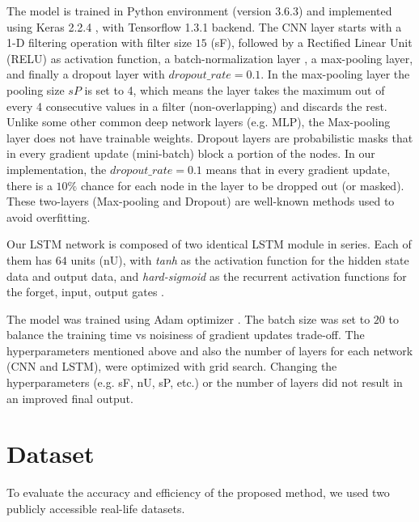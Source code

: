 \documentclass[letterpaper, 10 pt, conference]{ieeeconf}
\begin{document}
The model is trained in Python environment (version 3.6.3) and implemented using Keras 2.2.4 \cite{chollet2015keras}, with Tensorflow 1.3.1 backend. The CNN layer starts with a 1-D filtering operation with filter size $15$ (sF), followed by a Rectified Linear Unit (RELU) \cite{Nair:2010:RLU:3104322.3104425} as activation function, a batch-normalization layer \cite{DBLP:journals/corr/IoffeS15}, a max-pooling layer, and finally a dropout layer \cite{JMLR:v15:srivastava14a} with $dropout\_rate = 0.1$. In the max-pooling layer the pooling size $sP$ is set to 4, which means the layer takes the maximum out of every 4 consecutive values in a filter (non-overlapping) and discards the rest. Unlike some other common deep network layers (e.g. MLP), the Max-pooling layer does not have trainable weights. Dropout layers are probabilistic masks that in every gradient update (mini-batch) block a portion of the nodes. In our implementation, the $dropout\_rate =0.1$ means that in every gradient update, there is a $10\%$ chance for each node in the layer to be dropped out (or masked).
These two-layers (Max-pooling and Dropout) are well-known methods used to avoid overfitting.

Our LSTM network is composed of two identical LSTM module in series. Each of them has $64$ units (nU), with \textit{tanh} as the activation function for the hidden state data and output data, and \textit{hard-sigmoid} as the recurrent activation functions for the forget, input, output gates \cite{doi:10.1162/neco.1997.9.8.1735}.

The model was trained using Adam optimizer \cite{Kingma2014AdamAM}. The batch size was set to $20$ to balance the training time vs noisiness of gradient updates trade-off. The hyperparameters mentioned above and also the number of layers for each network (CNN and LSTM), were optimized with grid search. Changing the hyperparameters (e.g. sF, nU, sP, etc.) or the number of layers did not result in an improved final output.

\section{Dataset} \label{sec: Data-set}
To evaluate the accuracy and efficiency of the proposed method, we used two publicly accessible real-life datasets.
\end{document}
